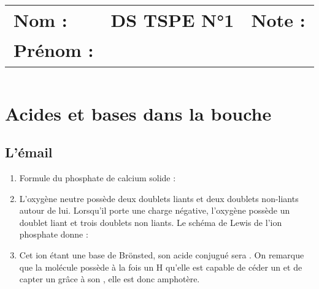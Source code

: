 \documentclass[a4paper,11pt,fleqn]{article}%
\title{\vspace{-1cm}\large 
	\begin{tabular}{|m{5cm}|>{\centering}m{8cm}|>{\centering\arraybackslash}m{4cm}|}
		\hline
		Nom : & \textbf{\textsc{DS TSPE N°1}} &  Note : \\
		Prénom : & & \\\hline
\end{tabular}}
\date{}
\begin{document}
\maketitle
\vspace{-2.5cm}

\section{Acides et bases dans la bouche}
	\subsection{L'émail}
	\begin{enumerate}
		\item Formule du phosphate de calcium solide : 
		\item L'oxygène neutre possède deux doublets liants et deux doublets non-liants autour de lui. Lorsqu'il porte une charge négative, l'oxygène possède un doublet liant et trois doublets non liants. Le schéma de Lewis de l'ion phosphate donne :\\
		
		\item Cet ion étant une base de Brönsted, son acide conjugué sera . On remarque que la molécule possède à la fois un H qu'elle est capable de céder un  et de capter un  grâce à son , elle est donc amphotère.
	\end{enumerate}
	
\end{document}
